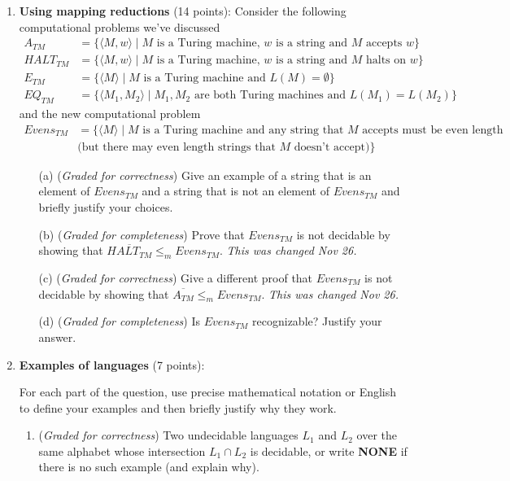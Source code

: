 \documentclass[12pt, oneside]{article}
\newcommand{\gradeCorrect}{({\it Graded for correctness}) }
\newcommand{\gradeComplete}{({\it Graded for completeness}) }
\begin{document}
\begin{enumerate}[wide, labelwidth=!, labelindent=0pt]
\item\textbf{Using mapping reductions} (14 points):
Consider the following computational problems we've discussed
\begin{align*}
A_{TM} &= \{ \langle M, w \rangle \mid M \text{ is a Turing machine, } w \text{ is a string and $M$ accepts $w$}\} \\
HALT_{TM} &= \{ \langle M, w \rangle \mid M \text{ is a Turing machine, } w \text{ is a string and $M$ halts on $w$}\} \\
E_{TM} &=  \{ \langle M \rangle \mid M \text{ is a Turing machine and } L(M) = \emptyset\} \\
EQ_{TM} &= \{ \langle M_1, M_2 \rangle \mid M_1, M_2 \text{ are both Turing machines and } L(M_1) = L(M_2) \}
\end{align*}
and the new computational problem
\begin{align*}
    Evens_{TM} &= \{ \langle M \rangle \mid M \text{ is a Turing machine 
    and any string that $M$ accepts must be even length}\\
    &\text{(but there may even length strings that $M$ doesn't accept)} \}
\end{align*}
\begin{enumerate}
\item[(a)] \gradeCorrect Give an example of a string that is an element of $Evens_{TM}$ and a string that is not an element of
$Evens_{TM}$ and briefly justify your choices.
\item[(b)] \gradeComplete Prove that $Evens_{TM}$ is not decidable by showing that $\overline{HALT_{TM}} \leq_m Evens_{TM}$. {\it This was changed Nov 26.}
\item[(c)] \gradeCorrect Give a different proof that $Evens_{TM}$ is not decidable by showing that $\overline{A_{TM}} \leq_m Evens_{TM}$. {\it This was changed Nov 26.}
\item[(d)] \gradeComplete Is $Evens_{TM}$ recognizable? Justify your answer.
\end{enumerate}


\item \textbf{Examples of languages} (7 points):

For each part of the question, use precise mathematical notation or English to define your examples
and then briefly justify why they work.

\begin{enumerate}
    \item\gradeCorrect Two undecidable languages $L_1$ and $L_2$ over the same alphabet
        whose intersection $L_1 \cap L_2$ is decidable, or write {\bf NONE}
        if there is no such example (and explain why).
    

\end{enumerate}
\end{enumerate}
\end{document}
